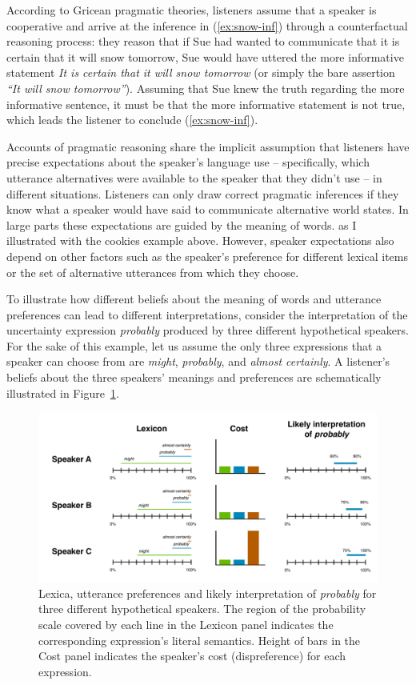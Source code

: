 According to Gricean pragmatic theories, listeners assume that a speaker is cooperative and arrive at the inference in (\ref{ex:snow-inf}) through a counterfactual reasoning process: they reason that if Sue had wanted to communicate that it is certain that it will snow tomorrow, Sue would have uttered the more informative statement \textit{It is certain that it will snow tomorrow} (or simply the bare assertion \emph{``It will snow tomorrow''}). Assuming that Sue knew the truth regarding the more informative sentence, it must be that the more informative statement is not true, which leads the listener to conclude (\ref{ex:snow-inf}). 

Accounts of pragmatic reasoning share the implicit assumption that listeners have precise expectations
 about the speaker's language use -- specifically, which utterance alternatives were available to the 
 speaker that they didn't use -- in different situations. Listeners can only draw correct pragmatic 
 inferences if they know what a speaker would have said to communicate alternative world states. 
 In large parts these expectations are guided by the meaning of words. as I illustrated with the cookies example above. 
However, speaker expectations also depend on other factors such as the speaker's preference for
 different lexical items or the set of alternative utterances from which they choose.
 
To illustrate how different beliefs about the meaning of words and utterance preferences can lead to different interpretations, consider the interpretation 
of the uncertainty expression \textit{probably} produced by three different hypothetical speakers. For the sake of this example, 
let us assume the only three expressions that a speaker can choose from are \textit{might}, \textit{probably}, and \textit{almost certainly}.
A listener's beliefs about the three speakers' meanings and preferences are schematically illustrated in Figure~\ref{fig:inference-example}.

\begin{figure}
\center
\includegraphics[width=\textwidth]{plots/fig-1-implicatures.pdf}
\caption{Lexica, utterance preferences and likely interpretation of \textit{probably} for three different hypothetical speakers. The region of the probability scale covered by each line in the Lexicon panel indicates the corresponding expression's literal semantics. Height of bars in the Cost panel indicates the speaker's cost (dispreference) for each expression.}
\label{fig:inference-example}
\end{figure}

